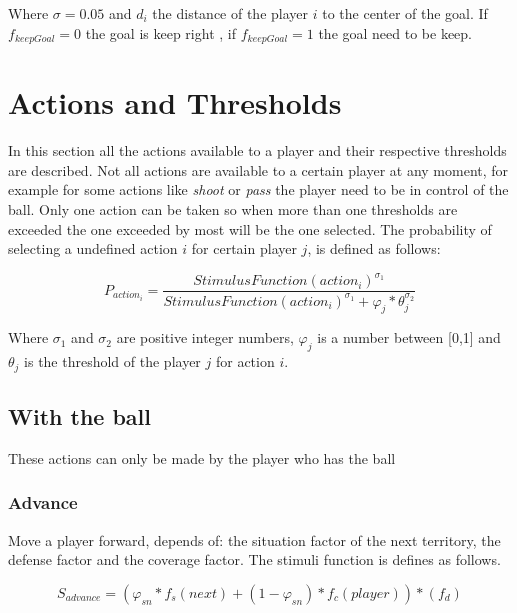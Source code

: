 \documentclass[
10pt, %
a4paper, %
oneside, %
headinclude,footinclude, %
BCOR5mm, %
]{scrartcl}
\begin{document}
Where $\sigma = 0.05$ and $d_i$ the distance of the player $i$ to the center of the goal. If $f_{keepGoal} = 0$ the goal is keep right , if $f_{keepGoal} = 1$ the goal need to be keep. 



\section{Actions and Thresholds}
In this section all the actions available to a player and their respective thresholds are described. Not all actions are available to a  certain player at any moment, for example for some actions like \textit{shoot} or \textit{pass} the player need to be in control of the ball. Only one action can be taken so when more than one thresholds are exceeded the one exceeded by most will be the one selected. The probability of selecting a undefined action $i$ for certain player $j$, is defined as follows:

\begin{equation}
	P_{action_i} = \frac{StimulusFunction(action_i)^{\sigma_1}}{ StimulusFunction(action_i)^{\sigma_1} + \varphi_j * \theta_j^{\sigma_2}}
\end{equation}

Where $\sigma_1$ and $\sigma_2$ are positive integer numbers, $\varphi_j$ is a number between [0,1] and $\theta_j$ is the threshold of the player $j$ for action $i$.

\subsection{With the ball}
These actions can only be made by the player who has the ball

\subsubsection{Advance}
Move a player forward, depends of: the situation factor of the next territory, the defense factor and the coverage factor. The stimuli function is defines as follows.

\begin{equation}
	S_{advance} = (\varphi_{sn} * f_{s}(next) + (1 - \varphi_{sn}) * f_{c}(player)) * (f_{d})
\end{equation}
\end{document}
